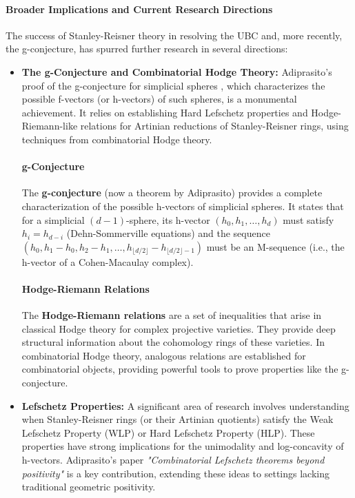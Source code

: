 \documentclass[12pt]{article}
\theoremstyle{definition}
\numberwithin{equation}{subsection}
\begin{document}
\paragraph{Broader Implications and Current Research Directions}
The success of Stanley-Reisner theory in resolving the UBC and, more recently, the g-conjecture, has spurred further research in several directions:
\begin{itemize}
\item \textbf{The g-Conjecture and Combinatorial Hodge Theory:} Adiprasito's proof of the g-conjecture for simplicial spheres , which characterizes the possible f-vectors (or h-vectors) of such spheres, is a monumental achievement. It relies on establishing Hard Lefschetz properties and Hodge-Riemann-like relations for Artinian reductions of Stanley-Reisner rings, using techniques from combinatorial Hodge theory.

\paragraph{g-Conjecture}
The \textbf{g-conjecture} (now a theorem by Adiprasito) provides a complete characterization of the possible h-vectors of simplicial spheres. It states that for a simplicial $(d-1)$-sphere, its h-vector $(h_0, h_1, \ldots, h_d)$ must satisfy $h_i = h_{d-i}$ (Dehn-Sommerville equations) and the sequence $(h_0, h_1-h_0, h_2-h_1, \ldots, h_{\lfloor d/2 \rfloor} - h_{\lfloor d/2 \rfloor - 1})$ must be an M-sequence (i.e., the h-vector of a Cohen-Macaulay complex).

\paragraph{Hodge-Riemann Relations}
The \textbf{Hodge-Riemann relations} are a set of inequalities that arise in classical Hodge theory for complex projective varieties. They provide deep structural information about the cohomology rings of these varieties. In combinatorial Hodge theory, analogous relations are established for combinatorial objects, providing powerful tools to prove properties like the g-conjecture.
\item \textbf{Lefschetz Properties:} A significant area of research involves understanding when Stanley-Reisner rings (or their Artinian quotients) satisfy the Weak Lefschetz Property (WLP) or Hard Lefschetz Property (HLP). These properties have strong implications for the unimodality and log-concavity of h-vectors. Adiprasito's paper \textit{"Combinatorial Lefschetz theorems beyond positivity"}  is a key contribution, extending these ideas to settings lacking traditional geometric positivity.


\end{itemize}
\end{document}
